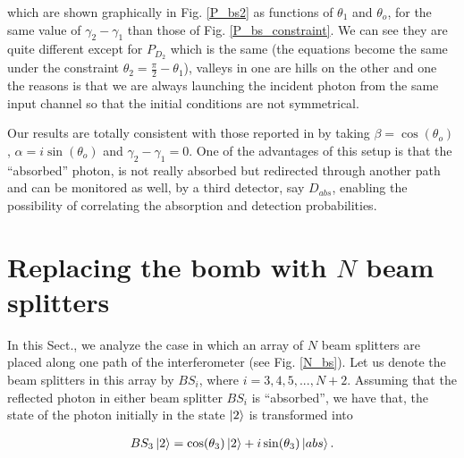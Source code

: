 \documentclass[12pt]{book}
\begin{document}
which are shown graphically in Fig. \ref{P_bs2} as functions of $\theta_{1}$ and $\theta_{o}$, for the same value of  $\gamma_{2}-\gamma_{1}$ than those of Fig. \ref{P_bs_constraint}. We can see they are quite different except for $P_{D_{2}}$ which is the same (the equations become the same under the constraint $\theta_{2}=\frac{\pi}{2}-\theta_{1}$), valleys in one are hills on the other and one the reasons is that we are always launching the incident photon from the same input channel so that the initial conditions are not symmetrical.




Our results are totally consistent with those reported in \cite{zuri,azuri} by taking $\beta=\cos(\theta_{o})$, $\alpha=i \sin(\theta_{o})$ and $\gamma_{2}-\gamma_{1}=0$. One of the advantages of this setup is that the ``absorbed'' photon, is not really absorbed but redirected through another path and can be monitored as well, by a third detector, say $D_{abs}$, enabling the possibility of correlating the absorption and detection probabilities.

\section{Replacing the bomb with $N$ beam splitters }





In this Sect., we analyze the case in which an array of $N$ beam splitters are placed along one path of the interferometer (see Fig. \ref{N_bs}). Let us denote the beam splitters in this array by $BS_{i}$, where $i=3,4,5,...,N+2$. Assuming that the reflected photon in either beam splitter $BS_{i}$ is ``absorbed'', we have that, the state of the photon initially in the state $\ket{2}$ is transformed into

\begin{align}
BS_{3}\ket{2}=\cos(\theta_{3})\ket{2}+i\sin(\theta_{3})\ket{abs}.
\end{align}
\end{document}
